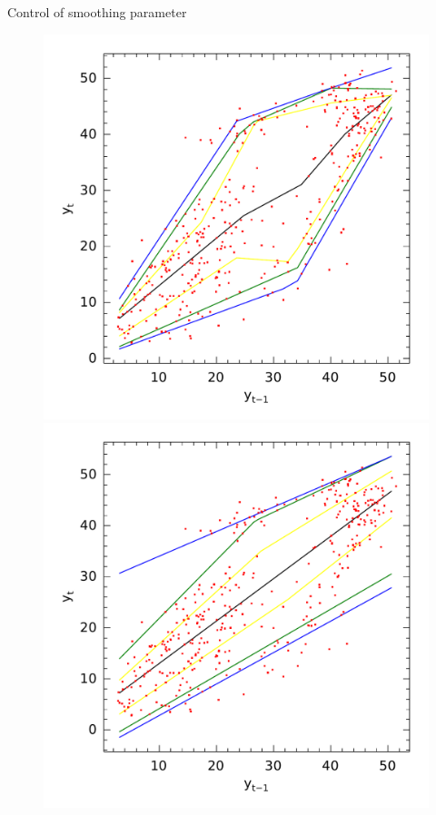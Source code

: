 \begin{frame}{Control of smoothing parameter}

\begin{figure}
  \centering
  \begin{minipage}[t]{\linewidth}
    \centering
    \begin{minipage}[t]{0.45\linewidth}
      \centering     \includegraphics[width=\textwidth]{../Figuras/npqar/icaraizinho-crossing-10}
    \end{minipage}
    \begin{minipage}[t]{0.45\linewidth}
      \centering     \includegraphics[width=\textwidth]{../Figuras/npqar/icaraizinho-crossing-100}

\end{minipage}
\end{minipage}
\end{figure}
\end{frame}
